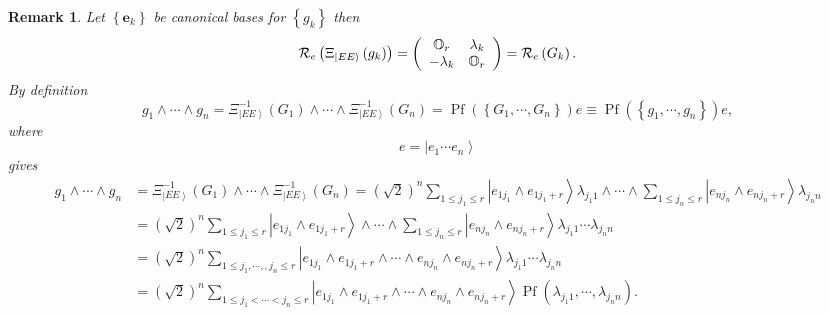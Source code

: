 \documentclass[aps,preprint]{revtex4}%
\newtheorem{remark}[theorem]{Remark}
\begin{document}
\begin{remark}
Let $\left\{  \mathbf{e}_{k}\right\}  $ be canonical bases for $\left\{
g_{k}\right\}  $ then
\begin{equation}
\mathcal{R}_{e}\left(  \Xi_{\left\vert EE\right\rangle }\left(  g_{k}\right)
\right)  =\left(
\begin{array}
[c]{cc}%
\mathbb{O}_{r} & \mathbf{\lambda}_{k}\\
-\mathbf{\lambda}_{k} & \mathbb{O}_{r}%
\end{array}
\right)  =\mathcal{R}_{e}\left(  G_{k}\right)  .
\end{equation}
By definition
\begin{equation}
g_{1}\wedge\cdots\wedge g_{n}=\Xi_{\left\vert EE\right\rangle }^{-1}\left(
G_{1}\right)  \wedge\cdots\wedge\Xi_{\left\vert EE\right\rangle }^{-1}\left(
G_{n}\right)  =\operatorname{Pf}\left(  \left\{  G_{1},\cdots,G_{n}\right\}
\right)  e\equiv\operatorname{Pf}\left(  \left\{  g_{1},\cdots,g_{n}\right\}
\right)  e,
\end{equation}
where
\begin{equation}
e=\left\vert e_{1}\cdots e_{n}\right\rangle
\end{equation}
gives
\begin{align}
g_{1}\wedge\cdots\wedge g_{n}  &  =\Xi_{\left\vert EE\right\rangle }%
^{-1}\left(  G_{1}\right)  \wedge\cdots\wedge\Xi_{\left\vert EE\right\rangle
}^{-1}\left(  G_{n}\right)  =\left(  \sqrt{2}\right)  ^{n}\sum_{1\leq
j_{1}\leq r}\left\vert e_{1j_{1}}\wedge e_{1j_{1}+r}\right\rangle
\lambda_{j_{1}1}\wedge\cdots\wedge\sum_{1\leq j_{n}\leq r}\left\vert
e_{nj_{n}}\wedge e_{nj_{n}+r}\right\rangle \lambda_{j_{n}n}\\
&  =\left(  \sqrt{2}\right)  ^{n}\sum_{1\leq j_{1}\leq r}\left\vert e_{1j_{1}%
}\wedge e_{1j_{1}+r}\right\rangle \wedge\cdots\wedge\sum_{1\leq j_{n}\leq
r}\left\vert e_{nj_{n}}\wedge e_{nj_{n}+r}\right\rangle \lambda_{j_{1}1}%
\cdots\lambda_{j_{n}n}\\
&  =\left(  \sqrt{2}\right)  ^{n}\sum_{1\leq j_{1},\cdots,,j_{n}\leq
r}\left\vert e_{1j_{1}}\wedge e_{1j_{1}+r}\wedge\cdots\wedge e_{nj_{n}}\wedge
e_{nj_{n}+r}\right\rangle \lambda_{j_{1}1}\cdots\lambda_{j_{n}n}\\
&  =\left(  \sqrt{2}\right)  ^{n}\sum_{1\leq j_{1}<\cdots<j_{n}\leq
r}\left\vert e_{1j_{1}}\wedge e_{1j_{1}+r}\wedge\cdots\wedge e_{nj_{n}}\wedge
e_{nj_{n}+r}\right\rangle \operatorname{Pf}\left(  \lambda_{j_{1}1}%
,\cdots,\lambda_{j_{n}n}\right)  .
\end{align}

\end{remark}
\end{document}
